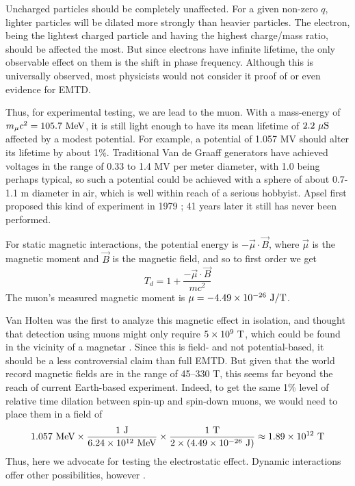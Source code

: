 Uncharged particles should be completely unaffected.
For a given non-zero $q$, lighter particles will be dilated more strongly than heavier particles.
The electron, being the lightest charged particle and having the highest charge/mass ratio,
should be affected the most.
But since electrons have infinite lifetime,
the only observable effect on them is the shift in phase frequency.
Although this is universally observed,
most physicists would not consider it proof of or even evidence for EMTD.

Thus, for experimental testing, we are lead to the muon.
With a mass-energy of $m_\mu c^2 = 105.7\ \textup{MeV}$,
it is still light enough to have its mean lifetime of $2.2\ \mu \textup{S}$
affected by a modest potential.
For example, a potential of 1.057 MV should alter its lifetime by about 1\%.
Traditional Van de Graaff generators have achieved voltages in the range of
0.33 to 1.4 MV per meter diameter, with 1.0 being perhaps typical,
so such a potential could be achieved
with a sphere of about 0.7-1.1 m diameter in air,
which is well within reach of a serious hobbyist.
Apsel first proposed this kind of experiment in 1979 \cite{Apsel1979};
41 years later it still has never been performed.

For static magnetic interactions, the potential energy is $-\vec{\mu}\cdot\vec{B}$,
where $\vec{\mu}$ is the magnetic moment and $\vec{B}$ is the magnetic field,
and so to first order we get
\begin{equation}\label{mtd}
T_d =  1 + \frac{-\vec{\mu}\cdot\vec{B}}{mc^2}
\end{equation}
The muon's measured magnetic moment is
$\mu = -4.49 \times 10^{-26}\ \textup{J}/\textup{T}$.

Van Holten was the first to analyze this magnetic effect in isolation,
and thought that detection using muons might only require $5 \times 10^9\ \textup{T}$,
which could be found in the vicinity of a magnetar \cite{vanHolten1992}.
Since this is field- and not potential-based,
it should be a less controversial claim than full EMTD.
But given that the world record magnetic fields are in the range of 45--330 T,
this seems far beyond the reach of current Earth-based experiment.
Indeed, to get the same 1\% level of relative time dilation between spin-up and spin-down muons,
we would need to place them in a field of
\begin{equation}
1.057\ \textup{MeV} \times \frac{1\ \textup{J}}{6.24\times 10^{12}\ \textup{MeV}} \times \frac{1\ \textup{T}}{2 \times (4.49 \times 10^{-26}\ \textup{J})} \approx 1.89 \times 10^{12}\ \textup{T}
\end{equation}
Thus, here we advocate for testing the electrostatic effect.
Dynamic interactions offer other possibilities, however \cite{Apsel1979}.

